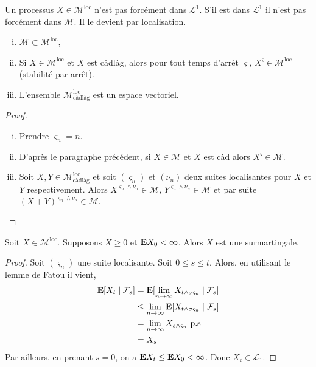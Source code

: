 	\begin{rem}
		Un processus $X \in \mathcal{M}^{\text{loc}}$ n'est pas forcément dans $\mathcal{L}^1$.
		S'il est dans $\mathcal{L}^1$ il n'est pas forcément dans $\mathcal{M}$.
		Il le devient par localisation.
	\end{rem}
	
	\begin{pop}
		\begin{enumerate}[(i)]
			\item $\mathcal{M} \subset \mathcal{M}^{\text{loc}}$,
			\item Si $X \in \mathcal{M}^{\text{loc}}$ et $X$ est càdlàg, alors pour tout temps d'arrêt $\varsigma$, $X^{\varsigma} \in \mathcal{M}^{\text{loc}}$ (stabilité par arrêt).
			\item L'ensemble $\mathcal{M}^{\text{loc}}_{\text{càdlàg}}$ est un espace vectoriel.
		\end{enumerate}
	\end{pop}
	
	\begin{proof}
		\begin{enumerate}[(i)]
			\item Prendre $\varsigma_n = n$.
			\item D'après le paragraphe précédent, si $X \in \mathcal{M}$ et $X$ est càd alors $X^{\varsigma} \in \mathcal{M}$.
			\item Soit $X, Y \in \mathcal{M}^{\text{loc}}_{\text{càdlàg}}$ et soit $(\varsigma_n)$ et $(\nu_n)$ deux suites localisantes pour $X$ et $Y$ respectivement.
			Alors  $X^{\varsigma_n \wedge \nu_n} \in \mathcal{M}$, $Y^{\varsigma_n \wedge \nu_n} \in \mathcal{M}$ et par suite $(X + Y)^{\varsigma_n \wedge \nu_n} \in \mathcal{M}$.
		\end{enumerate}
	\end{proof}
	
	\begin{pop}
		Soit $X \in \mathcal{M}^{\text{loc}}$.
		Supposons $X \geq 0$ et $\mathbf{E} X_0 < \infty$.
		Alors $X$ est une surmartingale.
	\end{pop}
	
	\begin{proof}
		Soit $(\varsigma_n)$ une suite localisante.
		Soit $0 \leq s \leq t$.
		Alors, en utilisant le lemme de Fatou il vient,
		\begin{align*}
		\mathbf{E}[X_t \mid \mathcal{F}_s] & = \mathbf{E}[\lim_{n \to \infty} X_{t \wedge \sigma \varsigma_n} \mid \mathcal{F}_s] \\
		                             & \leq \lim_{n \to \infty} \mathbf{E}[X_{t \wedge \sigma \varsigma_n} \mid \mathcal{F}_s] \\
		                             & = \lim_{n \to \infty} X_{s \wedge \varsigma_n}\ \text{p.s}\\
		                             & = X_s
		\end{align*}
		Par ailleurs, en prenant $s = 0$, on a $\mathbf{E} X_t \leq \mathbf{E} X_0 < \infty$.
		Donc $X_t \in \mathcal{L}_1$.
	\end{proof}
	
